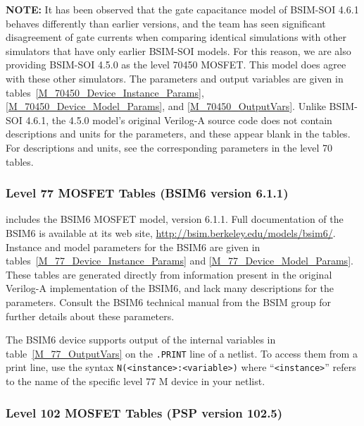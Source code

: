 \textbf{NOTE:} It has been observed that the gate capacitance model of
BSIM-SOI 4.6.1 behaves differently than earlier versions, and the team
has seen significant disagreement of gate currents when comparing
identical simulations with other simulators that have only earlier
BSIM-SOI models.  For this reason, we are also providing BSIM-SOI
4.5.0 as the level 70450 MOSFET.  This model does agree with these
other simulators.  The parameters and output variables are given in
tables~\ref{M_70450_Device_Instance_Params},
\ref{M_70450_Device_Model_Params}, and \ref{M_70450_OutputVars}.
Unlike BSIM-SOI 4.6.1, the 4.5.0 model's original Verilog-A source
code does not contain descriptions and units for the parameters, and
these appear blank in the tables.  For descriptions and units, see the
corresponding parameters in the level 70 tables.








\clearpage
\subsubsection{Level 77 MOSFET Tables (BSIM6 version 6.1.1)}
\Xyce{} includes the BSIM6 MOSFET model, version 6.1.1.  Full
documentation of the BSIM6 is available at its web site,
\url{http://bsim.berkeley.edu/models/bsim6/}.  Instance and model
parameters for the BSIM6 are given in
tables~\ref{M_77_Device_Instance_Params} and
\ref{M_77_Device_Model_Params}.  These tables are generated directly
from information present in the original Verilog-A implementation of
the BSIM6, and lack many descriptions for the parameters.  Consult the
BSIM6 technical manual from the BSIM group for further details about
these parameters.

The BSIM6 device supports output of the internal variables in
table~\ref{M_77_OutputVars} on the \texttt{.PRINT} line of a netlist.
To access them from a print line, use the syntax
\texttt{N(<instance>:<variable>)} where ``\texttt{<instance>}'' refers to the
name of the specific level 77 M device in your netlist.





\clearpage
\subsubsection{Level 102 MOSFET Tables (PSP version 102.5)}

